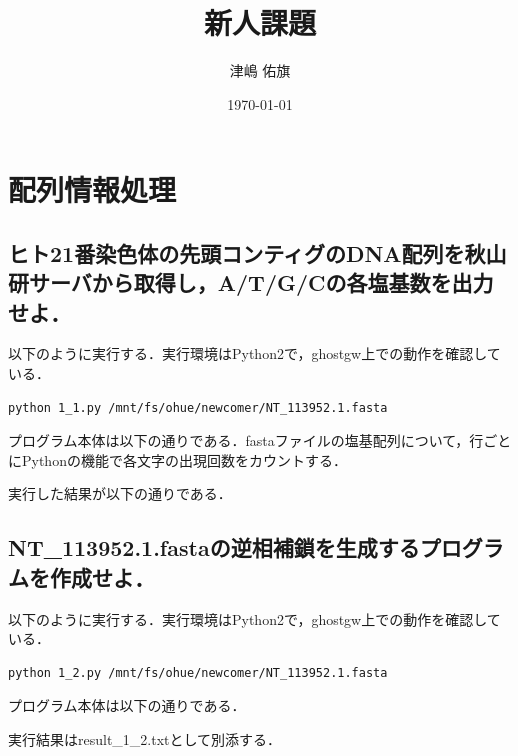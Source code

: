 \documentclass[uplatex,a4j]{jsarticle}
\title{新人課題}
\author{津嶋 佑旗}
\date{\today}
\begin{document}
  \maketitle
  \section{配列情報処理}
  \subsection{ヒト21番染色体の先頭コンティグのDNA配列を秋山研サーバから取得し，A/T/G/Cの各塩基数を出力せよ．}
  以下のように実行する．実行環境はPython2で，ghostgw上での動作を確認している．
  \begin{lstlisting}[caption=実行方法, label=run1]
    python 1_1.py /mnt/fs/ohue/newcomer/NT_113952.1.fasta
  \end{lstlisting}
  プログラム本体は以下の通りである．fastaファイルの塩基配列について，行ごとにPythonの機能で各文字の出現回数をカウントする．
  
  実行した結果が以下の通りである．
  
  
  \subsection{NT\_113952.1.fastaの逆相補鎖を生成するプログラムを作成せよ．}
  以下のように実行する．実行環境はPython2で，ghostgw上での動作を確認している．
  \begin{lstlisting}[caption=実行方法, label=run2]
    python 1_2.py /mnt/fs/ohue/newcomer/NT_113952.1.fasta
  \end{lstlisting}
  プログラム本体は以下の通りである．
  
  
  
  実行結果はresult\_1\_2.txtとして別添する．
  
\end{document}
